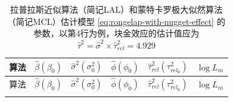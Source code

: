 \documentclass[12pt,a4paper,UTF8,twoside]{book}
\theoremstyle{definition}
\theoremstyle{definition}
\theoremstyle{definition}
\theoremstyle{remark}
\begin{document}
\begin{longtable}[]{@{}clllll@{}}
\caption{\label{tab:rongelap-mcml-result}
拉普拉斯近似算法（简记LAL）和蒙特卡罗极大似然算法（简记MCL）估计模型
\eqref{eq:rongelap-with-nugget-effect}
的参数，以第4行为例，块金效应的估计值应为
\(\hat{\tau}^2 = \hat{\sigma}^{2} \times \hat{\tau}^2_{rel} = 4.929\)}\tabularnewline
\toprule
\begin{minipage}[b]{0.09\columnwidth}\centering
算法\strut
\end{minipage} & \begin{minipage}[b]{0.15\columnwidth}\raggedright
\(\hat{\beta}(\beta_{0})\)\strut
\end{minipage} & \begin{minipage}[b]{0.15\columnwidth}\raggedright
\(\hat{\sigma}^{2}(\sigma^2_0)\)\strut
\end{minipage} & \begin{minipage}[b]{0.15\columnwidth}\raggedright
\(\hat{\phi}(\phi_0)\)\strut
\end{minipage} & \begin{minipage}[b]{0.15\columnwidth}\raggedright
\(\hat{\tau}^2_{rel}(\tau^2_{rel_0})\)\strut
\end{minipage} & \begin{minipage}[b]{0.15\columnwidth}\raggedright
\(\log L_{m}\)\strut
\end{minipage}\tabularnewline
\midrule
\endfirsthead
\toprule
\begin{minipage}[b]{0.09\columnwidth}\centering
算法\strut
\end{minipage} & \begin{minipage}[b]{0.15\columnwidth}\raggedright
\(\hat{\beta}(\beta_{0})\)\strut
\end{minipage} & \begin{minipage}[b]{0.15\columnwidth}\raggedright
\(\hat{\sigma}^{2}(\sigma^2_0)\)\strut
\end{minipage} & \begin{minipage}[b]{0.15\columnwidth}\raggedright
\(\hat{\phi}(\phi_0)\)\strut
\end{minipage} & \begin{minipage}[b]{0.15\columnwidth}\raggedright
\(\hat{\tau}^2_{rel}(\tau^2_{rel_0})\)\strut
\end{minipage} & \begin{minipage}[b]{0.15\columnwidth}\raggedright
\(\log L_{m}\)\strut
\end{minipage}\tabularnewline
\midrule
\endhead
\begin{minipage}[t]{0.09\columnwidth}\centering

\end{minipage}
\end{longtable}
\end{document}
